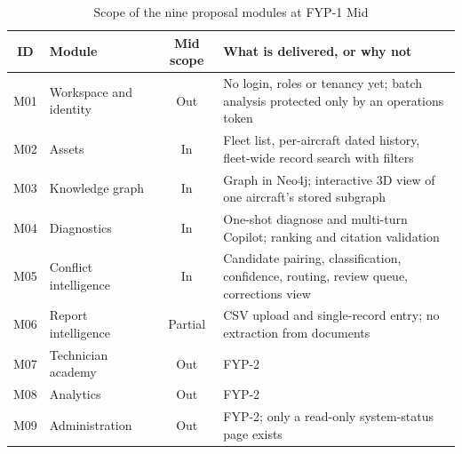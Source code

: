 \begin{table}[H]
\centering
\caption{Scope of the nine proposal modules at FYP-1 Mid}
\label{tab:scope-modules}
\small
\begin{tabularx}{\textwidth}{@{}c >{\raggedright\arraybackslash}p{} c L@{}}
\toprule
ID & Module & Mid scope & What is delivered, or why not \\
\midrule
M01 & Workspace and identity & Out & No login, roles or tenancy yet; batch analysis protected only by an operations token \\
M02 & Assets & In & Fleet list, per-aircraft dated history, fleet-wide record search with filters \\
M03 & Knowledge graph & In & Graph in Neo4j; interactive 3D view of one aircraft's stored subgraph \\
M04 & Diagnostics & In & One-shot diagnose and multi-turn Copilot; ranking and citation validation \\
M05 & Conflict intelligence & In & Candidate pairing, classification, confidence, routing, review queue, corrections view \\
M06 & Report intelligence & Partial & CSV upload and single-record entry; no extraction from documents \\
M07 & Technician academy & Out & FYP-2 \\
M08 & Analytics & Out & FYP-2 \\
M09 & Administration & Out & FYP-2; only a read-only system-status page exists \\
\bottomrule
\end{tabularx}
\end{table}
